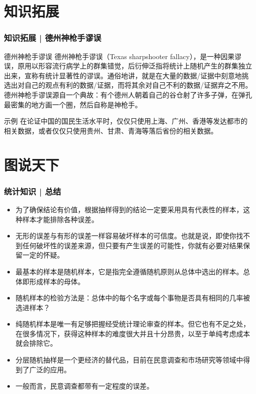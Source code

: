 \section{知识拓展}
\begin{frame}
  \frametitle{知识拓展 | 德州神枪手谬误}
  \begin{block}{德州神枪手谬误}
    德州神枪手谬误（Texas sharpshooter fallacy），是一种因果谬误，原用以形容流行病学上的群集错觉，后衍伸泛指将统计上随机产生的群集独立出来，宣称有统计显著性的谬误。通俗地讲，就是在大量的数据/证据中刻意地挑选出对自己的观点有利的数据/证据，而将其余对自己不利的数据/证据弃之不用。\\
    \vspace{0.5em}
    德州神枪手谬误源自一个典故：有个德州人朝着自己的谷仓射了许多子弹，在弹孔最密集的地方画一个圈，然后自称是神枪手。
  \end{block}
  \pause
  \begin{block}{示例}
    在论证中国的国民生活水平时，仅仅只使用上海、广州、香港等发达都市的相关数据，或者仅仅只使用贵州、甘肃、青海等落后省份的相关数据。
  \end{block}
\end{frame}

\section{图说天下}


\begin{frame}
  \frametitle{统计知识 | 总结}
  \begin{itemize}
    \item 为了确保结论有价值，根据抽样得到的结论一定要采用具有代表性的样本，这种样本才能排除各种误差。
    \item 无形的误差与有形的误差一样容易破坏样本的可信度。也就是说，即使你找不到任何破坏性的误差来源，但只要有产生误差的可能性，你就有必要对结果保留一定的怀疑。
    \item 最基本的样本是随机样本，它是指完全遵循随机原则从总体中选出的样本。总体即形成样本的母体。 
    \item 随机样本的检验方法是：总体中的每个名字或每个事物是否具有相同的几率被选进样本？
    \item 纯随机样本是唯一有足够把握经受统计理论审查的样本。但它也有不足之处，在很多情况下，获得这种样本的难度很大并且十分昂贵，以至于单纯考虑成本就会排除它。
    \item 分层随机抽样是一个更经济的替代品，目前在民意调查和市场研究等领域中得到了广泛的应用。
    \item 一般而言，民意调查都带有一定程度的误差。
  \end{itemize}
\end{frame}



